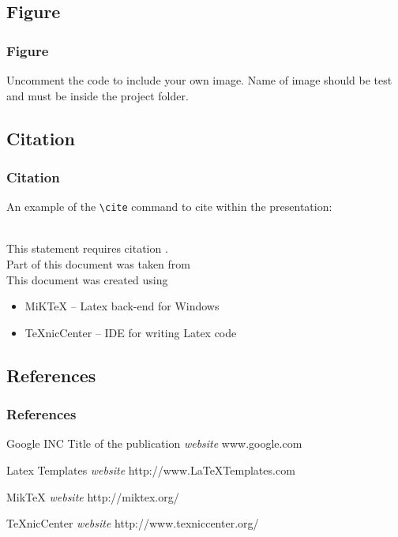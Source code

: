 \documentclass[table,10pt,red]{beamer}	%
\begin{document}
\subsection{Figure} %
\begin{frame}
\frametitle{Figure}
Uncomment the code to include your own image. Name of image should be test and must be inside the project folder.
\end{frame}

\subsection{Citation} %
\begin{frame}[fragile] %
\frametitle{Citation}
An example of the \verb|\cite| command to cite within the presentation:\\~

This statement requires citation \cite{p1}.\\
Part of this document was taken from \cite{p2} \\
This document was created using
\begin{itemize}
	\item MiKTeX -- Latex back-end for Windows \cite{p3}
	\item TeXnicCenter -- IDE for writing Latex code \cite{p4}
\end{itemize}
\end{frame}

\subsection{References} %
\begin{frame}
\frametitle{References}
\footnotesize{
\begin{thebibliography}{99} %
 Google INC 
\newblock Title of the publication
\newblock \emph{website} www.google.com

 Latex Templates 
\newblock \emph{website} http://www.LaTeXTemplates.com

 MikTeX 
\newblock \emph{website} http://miktex.org/

 TeXnicCenter 
\newblock \emph{website} http://www.texniccenter.org/

\end{thebibliography}
}
\end{frame}
\end{document}
